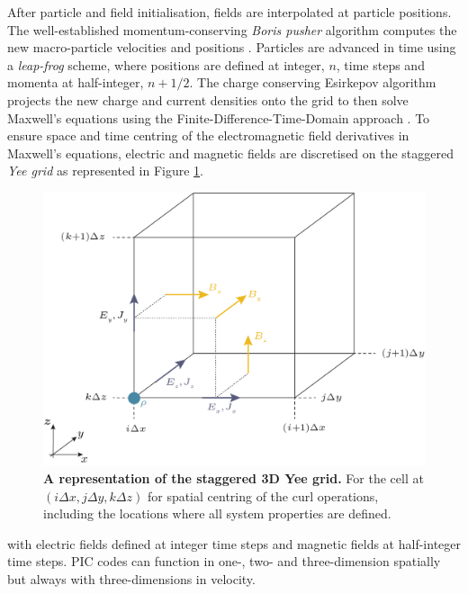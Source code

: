 After particle and field initialisation, fields are interpolated at particle positions. The well-established momentum-conserving \textit{Boris pusher} algorithm computes the new macro-particle velocities and positions \cite{borisRelativisticPlasmaSimulationoptimization1970}. Particles are advanced in time using a \textit{leap-frog }scheme, where positions are defined at integer, $n$, time steps and momenta at half-integer, $n + 1/2$. The charge conserving Esirkepov algorithm \cite{esirkepovExactChargeConservation2001} projects the new charge and current densities onto the grid to then solve Maxwell's equations using the Finite-Difference-Time-Domain approach \cite{tafloveComputationalElectromagneticsFiniteDifference2005}. To ensure space and time centring of the electromagnetic field derivatives in Maxwell's equations, electric and magnetic fields are discretised on the staggered \textit{Yee grid} as represented in Figure \ref{fig:introyeegrid}. 
\begin{figure}
	\centering
	\includegraphics[width=0.7\linewidth]{figures/intro/intro_yee_grid}
	\caption[A representation of the staggered Yee grid.]{\textbf{A representation of the staggered 3D Yee grid.} For the cell at $(i\Delta x, j\Delta y, k\Delta z)$ for spatial centring of the curl operations, including the locations where all system properties are defined.}
	\label{fig:introyeegrid}
\end{figure}
with electric fields defined at integer time steps and magnetic fields at half-integer time steps. PIC codes can function in one-, two- and three-dimension spatially but always with three-dimensions in velocity.

